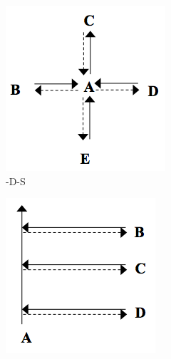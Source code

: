 \begin{figure}[!hbt]\centering
    \begin{subfigure}{0.3\textwidth}
 \includegraphics[width=\textwidth]{tdt1a}
 \caption{-D-S}
    \end{subfigure}\hspace{0.15\textwidth}
    \begin{subfigure}{0.285\textwidth}
\includegraphics[width=\textwidth]{tdt1b}

\end{subfigure}
\end{figure}
